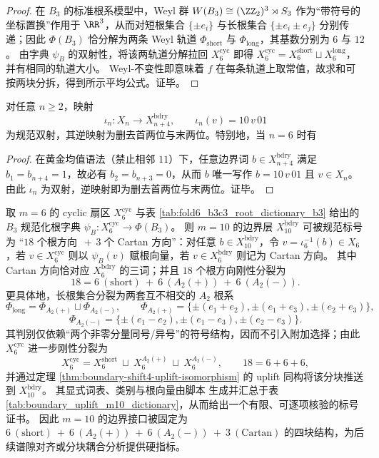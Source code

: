 \begin{proof}
在 \(B_3\) 的标准根系模型中，Weyl 群 \(W(B_3)\cong (\ZZ_2)^3\rtimes S_3\) 作为“带符号的坐标置换”作用于 \(\RR^3\)，从而对短根集合 \(\{\pm e_i\}\) 与长根集合 \(\{\pm e_i\pm e_j\}\) 分别传递；因此 \(\Phi(B_3)\) 恰分解为两条 Weyl 轨道 \(\Phi_{\mathrm{short}}\) 与 \(\Phi_{\mathrm{long}}\)，其基数分别为 \(6\) 与 \(12\)。
由字典 \(\psi_B\) 的双射性，将该两轨道分解拉回 \(X_6^{\mathrm{cyc}}\) 即得 \(X_6^{\mathrm{cyc}}=X_6^{\mathrm{short}}\sqcup X_6^{\mathrm{long}}\)，并有相同的轨道大小。
Weyl-不变性即意味着 \(f\) 在每条轨道上取常值，故求和可按两块分拆，得到所示平均公式。证毕。
\end{proof}

\begin{theorem}\label{thm:boundary-shift4-uplift-isomorphism}
对任意 \(n\ge 2\)，映射
\[
\iota_n:X_n\to X_{n+4}^{\mathrm{bdry}},\qquad \iota_n(v)=10\,v\,01
\]
为规范双射，其逆映射为删去首两位与末两位。特别地，当 \(n=6\) 时有

\end{theorem}
\begin{proof}
在黄金均值语法（禁止相邻 \(11\)）下，任意边界词 \(b\in X_{n+4}^{\mathrm{bdry}}\) 满足 \(b_1=b_{n+4}=1\)，故必有 \(b_2=b_{n+3}=0\)，从而 \(b\) 唯一写作 \(b=10\,v\,01\) 且 \(v\in X_n\)。
由此 \(\iota_n\) 为双射，逆映射即为删去首两位与末两位。证毕。
\end{proof}

\begin{theorem}\label{thm:boundary-m10-b3c3-rigid-four-block-split}
取 \(m=6\) 的 cyclic 扇区 \(X_6^{\mathrm{cyc}}\) 与表 \ref{tab:fold6_b3c3_root_dictionary_b3} 给出的 \(B_3\) 规范化根字典
\(\psi_B:X_6^{\mathrm{cyc}}\to\Phi(B_3)\)。
则 \(m=10\) 的边界层 \(X_{10}^{\mathrm{bdry}}\) 可被规范标号为 “\(18\) 个根方向 \(\,+\,3\) 个 Cartan 方向”：对任意 \(b\in X_{10}^{\mathrm{bdry}}\)，令 \(v=\iota_6^{-1}(b)\in X_6\)，若 \(v\in X_6^{\mathrm{cyc}}\) 则以 \(\psi_B(v)\) 赋根向量，若 \(v\in X_6^{\mathrm{bdry}}\) 则记为 Cartan 方向。
其中 Cartan 方向恰对应 \(X_6^{\mathrm{bdry}}\) 的三词；并且 \(18\) 个根方向刚性分裂为
\[
18=6\ (\mathrm{short})\ +\ 6\ (A_2(+))\ +\ 6\ (A_2(-)).
\]
更具体地，长根集合分裂为两套互不相交的 \(A_2\) 根系
\[
\Phi_{\mathrm{long}}=\Phi_{A_2(+)}\sqcup\Phi_{A_2(-)},\qquad
\Phi_{A_2(+)}=\{\pm(e_1+e_2),\pm(e_1+e_3),\pm(e_2+e_3)\},
\]
\[
\Phi_{A_2(-)}=\{\pm(e_1-e_2),\pm(e_1-e_3),\pm(e_2-e_3)\}.
\]
其判别仅依赖“两个非零分量同号/异号”的符号结构，因而不引入附加选择；由此 \(X_6^{\mathrm{cyc}}\) 进一步刚性分裂为
\[
X_6^{\mathrm{cyc}}=X_6^{\mathrm{short}}\ \sqcup\ X_6^{A_2(+)}\ \sqcup\ X_6^{A_2(-)},
\qquad 18=6+6+6,
\]
并通过定理 \ref{thm:boundary-shift4-uplift-isomorphism} 的 uplift 同构将该分块推送到 \(X_{10}^{\mathrm{bdry}}\)。
其显式词表、类别与根向量由脚本 \texttt{} 生成并汇总于表 \ref{tab:boundary_uplift_m10_dictionary}，从而给出一个有限、可逐项核验的标号证书。
因此 \(m=10\) 的边界接口被固定为
\(
6\ (\text{short})\ +\ 6\ (A_2(+))\ +\ 6\ (A_2(-))\ +\ 3\ (\text{Cartan})
\)
的四块结构，为后续谱隙对齐或分块耦合分析提供硬指标。
\end{theorem}


